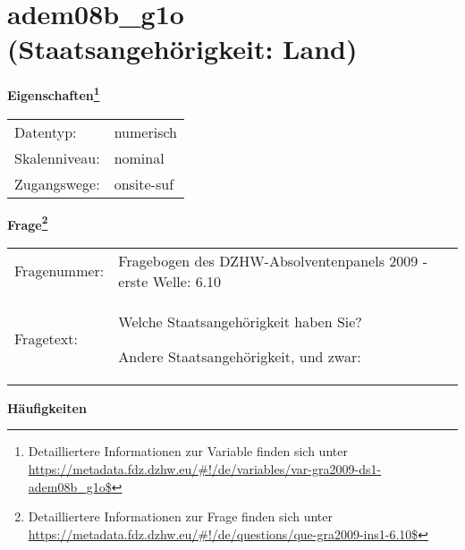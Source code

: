 
    \setcounter{footnote}{0}

    \vspace*{-1.8cm}
	\section{adem08b\_g1o (Staatsangehörigkeit: Land)}
	\label{section:adem08b_g1o}



    \vspace*{0.5cm}
    \noindent\textbf{Eigenschaften\footnote{Detailliertere Informationen zur Variable finden sich unter
		\url{https://metadata.fdz.dzhw.eu/\#!/de/variables/var-gra2009-ds1-adem08b_g1o$}}}\\
	\begin{tabularx}{\hsize}{@{}lX}
	Datentyp: & numerisch \\
	Skalenniveau: & nominal \\
	Zugangswege: &
	  onsite-suf
 \\
    \end{tabularx}



				\vspace*{0.5cm}
                \noindent\textbf{Frage\footnote{Detailliertere Informationen zur Frage finden sich unter
		              \url{https://metadata.fdz.dzhw.eu/\#!/de/questions/que-gra2009-ins1-6.10$}}}\\
				\begin{tabularx}{\hsize}{@{}lX}
					Fragenummer: &
					  Fragebogen des DZHW-Absolventenpanels 2009 - erste Welle:
					  6.10
 \\
					Fragetext: & Welche Staatsangehörigkeit haben Sie?\par  Andere Staatsangehörigkeit, und zwar: \\
				\end{tabularx}





        		\vspace*{0.5cm}
                \noindent\textbf{Häufigkeiten}

